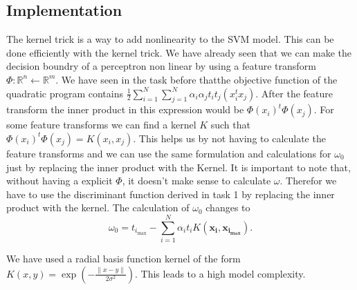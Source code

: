 \subsection{Implementation}
The kernel trick is a way to add nonlinearity to the SVM model. This can be done efficiently with the kernel trick. We have already seen that we can make the decision boundry of a perceptron non linear by using a feature transform $\Phi: \mathbb{R}^n \leftarrow \mathbb{R}^m$. We have seen in the task before thatthe objective function of the quadratic program contains $ \frac{1}{2} \sum\limits_{i=1}^N \sum\limits_{j=1}^N\alpha_i\alpha_jt_it_j(x_i^tx_j)$. After the feature transform the inner product in this expression would be $\Phi(x_i)^t\Phi(x_j)$. For some feature transforms we can find a kernel $K$ such that $\Phi(x_i)^t\Phi(x_j)=K(x_i,x_j)$. This helps us by not having to calculate the feature transforms and we can use the same formulation and calculations for $\omega_0$ just by replacing the inner product with the Kernel. It is important to note that, without having a explicit $\Phi$, it doesn't make sense to calculate $\omega$. Therefor we have to use the discriminant function derived in task 1 by replacing the inner product with the kernel. The calculation of $\omega_0$ changes to 
\[
	\omega_0 = t_{i_{\max}} -  \sum\limits_{i=1}^N\alpha_i t_i K(\bm{x_i},\bm{x_{i_{\max}}}).
\]

We have used a radial basis function kernel of the form $K(x,y) = \exp(-\frac{\lVert x-y \lVert}{2\sigma^2})$. This leads to a high model complexity.

